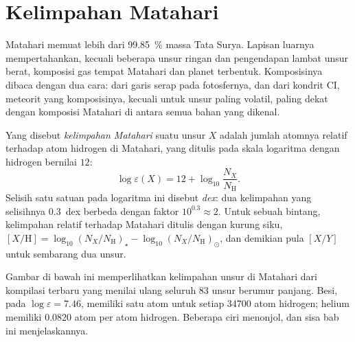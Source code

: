\section{Kelimpahan Matahari}\label{sec:b3:origin-of-elements:solar}

Matahari memuat lebih dari \qty{99.85}{\percent} massa Tata Surya. Lapisan luarnya
mempertahankan, kecuali beberapa unsur ringan dan pengendapan lambat unsur berat,
komposisi gas tempat Matahari dan planet terbentuk.
Komposisinya dibaca dengan dua cara: dari garis serap pada fotosfernya,
dan dari kondrit CI, meteorit yang komposisinya, kecuali untuk unsur paling volatil,
paling dekat dengan komposisi Matahari di antara semua bahan
yang dikenal.

\begin{definition}\label{def:b3:origin-of-elements:abundance}
Yang disebut \emph{kelimpahan Matahari} suatu unsur $X$ adalah
jumlah atomnya relatif terhadap atom hidrogen di Matahari,
yang ditulis pada skala logaritma dengan hidrogen bernilai $12$:
\[
\log\varepsilon(X) = 12 + \log_{10}\frac{N_X}{N_\mathrm{H}} .
\]
Selisih satu satuan pada logaritma ini disebut
\emph{dex}: dua kelimpahan yang selisihnya $0.3$~dex berbeda dengan
faktor $10^{0.3} \approx 2$. Untuk sebuah bintang, kelimpahan relatif terhadap
Matahari ditulis dengan kurung siku,
$[X/\mathrm{H}] = \log_{10}(N_X/N_\mathrm{H})_\star -
\log_{10}(N_X/N_\mathrm{H})_\odot$, dan demikian pula $[X/Y]$ untuk sembarang dua
unsur.
\end{definition}

Gambar di bawah ini memperlihatkan kelimpahan unsur di Matahari dari kompilasi terbaru
yang menilai ulang seluruh 83 unsur berumur panjang. Besi, pada
$\log\varepsilon = 7.46$, memiliki satu atom untuk setiap \num{34700} atom
hidrogen; helium memiliki \num{0.0820} atom per atom hidrogen. Beberapa
ciri menonjol, dan sisa bab ini menjelaskannya.

